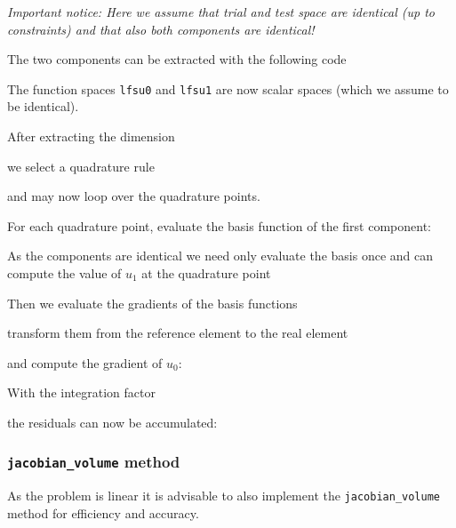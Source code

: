 \documentclass[a4paper,12pt]{article}
\begin{document}
\textit{Important notice: Here we assume that trial and test space are identical
(up to constraints) and that also both components are identical!}

The two components can be extracted with the following code

The function spaces \lstinline{lfsu0} and \lstinline{lfsu1} are
now scalar spaces (which we assume to be identical).

After extracting the dimension

we select a quadrature rule

and may now loop over the quadrature points.

For each quadrature point, evaluate the basis function
of the first component:

As the components are identical we need only evaluate the basis once
and can compute the value of $u_1$ at the quadrature point

Then we evaluate the gradients of the basis functions

transform them from the reference element to the real element

and compute the gradient of $u_0$:

With the integration factor

the residuals can now be accumulated:


\subsubsection*{\lstinline{jacobian_volume} method}

As the problem is linear it is advisable to also implement the
\lstinline{jacobian_volume} method for efficiency and accuracy.
\end{document}
